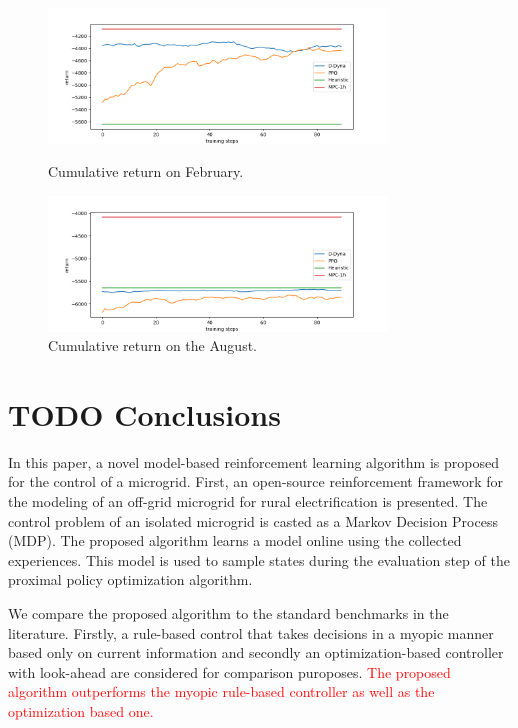 \documentclass{article}
\begin{document}
    \begin{figure}
     	\centering
     	\begin{minipage}{0.6\textwidth}
     		\centering
     		\includegraphics[width=0.8\textwidth]{feb.png}
     		\caption{Cumulative return on February.}
			\label{fig:transfer-feb}
     	\end{minipage} \hfill
     	\begin{minipage}{0.6\textwidth}
     		\centering
     		\includegraphics[width=0.8\textwidth]{aug.png}
     		\caption{Cumulative return on the August.}
			\label{fig:transfer-aug}
     	\end{minipage}
     
     \end{figure}

\section{\textbf{TODO} Conclusions} \label{sec: conclusions}
    In this paper, a novel model-based reinforcement learning algorithm is proposed for the control of a microgrid. First, an open-source reinforcement framework for the modeling of an off-grid microgrid for rural electrification is presented. The control problem of an isolated microgrid is casted as a Markov Decision Process (MDP). The proposed algorithm learns a model online using the collected experiences. This model is used to sample states during the evaluation step of the proximal policy optimization algorithm.
    
    We compare the proposed algorithm to the standard benchmarks in the literature. Firstly, a rule-based control that takes decisions in a myopic manner based only on current information and secondly an optimization-based controller with look-ahead are considered for comparison puroposes. \textcolor{red}{The proposed algorithm outperforms the myopic rule-based controller as well as the optimization based one.}
    
\end{document}
